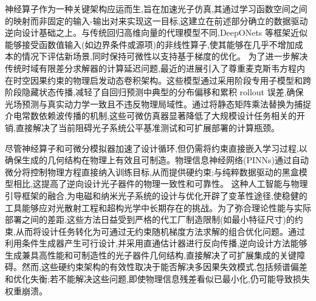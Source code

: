 神经算子作为一种关键架构应运而生,旨在加速光子仿真,其通过学习函数空间之间的映射而非固定的输入-输出对来实现这一目标,这建立在前述部分确立的数据驱动逆向设计基础之上。与传统回归高维向量的代理模型不同,DeepONets 等框架近似能够接受函数值输入(如边界条件或源项)的非线性算子,使其能够在几乎不增加成本的情况下评估新场景,同时保持可微性以支持基于梯度的优化。\citep{doi_10_48550_arxiv_2406_05072_c02ad5f4} \citep{doi_10_1122_8_0000908_e28c4124} 为了进一步解决传统时域有限差分求解器的计算延迟问题,最近的进展引入了尊重麦克斯韦方程内在时空因果约束的物理启发动态卷积架构。这些模型通过采用阶段专用子模型和跨阶段隐藏状态传播,减轻了自回归预测中典型的分布偏移和累积 rollout 误差,确保光场预测与真实动力学一致且不违反物理局域性。通过将静态矩阵乘法替换为捕捉介电常数依赖波传播的机制,这些可微仿真器显著降低了大规模设计任务相关的开销,直接解决了当前阻碍光子系统公平基准测试和可扩展部署的计算瓶颈。\citep{doi_10_48550_arxiv_2601_00199_c689b34d} \citep{doi_10_48550_arxiv_2406_17810_813bd2a3}

尽管神经算子和可微分模拟器加速了设计循环,但仍需将约束直接嵌入学习过程,以确保生成的几何结构在物理上有效且可制造。物理信息神经网络(PINNs)通过自动微分将控制物理方程直接纳入训练目标,从而提供硬约束;与纯粹数据驱动的黑盒模型相比,这提高了逆向设计光子器件的物理一致性和可靠性。\citep{doi_10_48550_arxiv_2606_12337_68b62bfa} \citep{doi_10_48550_arxiv_2603_09359_098af542} 这种人工智能与物理引导框架的融合,为电磁和纳米光子系统的设计与优化开辟了变革性途径,使稳健的工具能够应对光散射工程和超构光学中长期存在的挑战。为了弥合理论性能与实际部署之间的差距,这些方法日益受到严格的代工厂制造限制(如最小特征尺寸)的约束,从而将设计任务转化为可通过无约束随机梯度方法求解的组合优化问题。通过利用条件生成器产生可行设计,并采用直通估计器进行反向传播,逆向设计方法能够生成兼具高性能和可制造性的光子器件几何结构,直接解决了可扩展集成的关键障碍。然而,这些硬约束架构的有效性取决于能否解决多因果失效模式,包括频谱偏差和优化失衡;若不能解决这些问题,即使物理信息残差看似已最小化,仍可能导致损失权重崩溃。\citep{s2_cc39d5405a933620426d86298fa8fe4cd51915c5_27626ee3} \citep{s2_037e66f37189104d61c0d000de0cee202b7eec9e_d15b8018} \citep{doi_10_1021_acsphotonics_2c00313_0d7d39c3}

